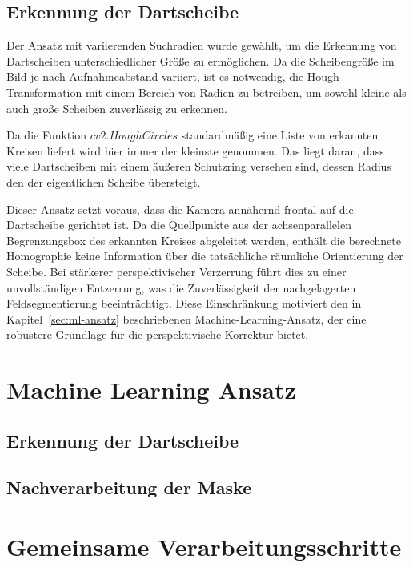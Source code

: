 \subsection{Erkennung der Dartscheibe}

Der Ansatz mit variierenden Suchradien wurde gewählt, um die Erkennung von Dartscheiben unterschiedlicher Größe zu ermöglichen. Da die Scheibengröße im Bild je nach Aufnahmeabstand variiert, ist es notwendig, die Hough-Transformation mit einem Bereich von Radien zu betreiben, um sowohl kleine als auch große Scheiben zuverlässig zu erkennen.

Da die Funktion $cv2.HoughCircles$ standardmäßig eine Liste von erkannten Kreisen liefert \cite{noauthor_opencv_nodate} wird hier immer der kleinste genommen. Das liegt daran, dass viele Dartscheiben mit einem äußeren Schutzring versehen sind, dessen Radius den der eigentlichen Scheibe übersteigt.

Dieser Ansatz setzt voraus, dass die Kamera annähernd frontal auf die Dartscheibe gerichtet ist. Da die Quellpunkte aus der achsenparallelen Begrenzungsbox des erkannten Kreises abgeleitet werden, enthält die berechnete Homographie keine Information über die tatsächliche räumliche Orientierung der Scheibe. Bei stärkerer perspektivischer Verzerrung führt dies zu einer unvollständigen Entzerrung, was die Zuverlässigkeit der nachgelagerten Feldsegmentierung beeinträchtigt. Diese Einschränkung motiviert den in Kapitel~\ref{sec:ml-ansatz} beschriebenen Machine-Learning-Ansatz, der eine robustere Grundlage für die perspektivische Korrektur bietet.

\section{Machine Learning Ansatz}

\subsection{Erkennung der Dartscheibe}


\subsection{Nachverarbeitung der Maske}

\section{Gemeinsame Verarbeitungsschritte}

